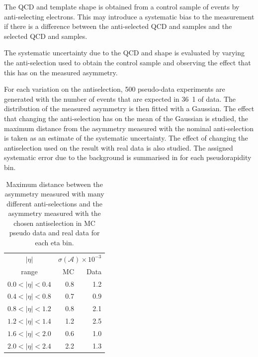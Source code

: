 The \ac{QCD} and \gjet \ETm template shape is obtained from a control sample of
events by anti-selecting electrons. This may introduce a systematic bias to the
measurement if there is a difference between the anti-selected \ac{QCD} and \gjet
\ETm samples and the selected \ac{QCD} and \gjet samples.

The systematic uncertainty due to the \ac{QCD} and \gjet \ETm shape is evaluated by
 varying the anti-selection used to obtain the control sample and observing the
effect that this has on the measured asymmetry.

For each variation on the antiselection, 500 pseudo-data experiments
are
generated with the number of events that are expected in \unit{36.1}{\invpb} of
data. The distribution of the measured asymmetry is then fitted with a
Gaussian.
The effect that changing the anti-selection has on the mean of the Gaussian is
studied, the maximum distance from the asymmetry measured with the nominal
anti-selection is taken as an estimate of the systematic uncertainty.
The effect of changing the antiselection used on the result with real data is
also studied.
The assigned systematic error due to the background is summarised in
 for each pseudorapidity bin.

\begin{table}[htbp]
\begin{center}
\begin{tabular}{crr}
    \toprule
$|\eta|$  &\multicolumn{2}{c}{ $\sigma(\mathcal{A}) \times 10^{-3}$}\\
   range      & MC & Data\\
\midrule
$0.0<|\eta|<0.4$ & 0.8 & 1.2\\
$0.4<|\eta|<0.8$ & 0.7 & 0.9\\
$0.8<|\eta|<1.2$ & 0.8 & 2.1\\
$1.2<|\eta|<1.4$ & 1.2 & 2.5\\
$1.6<|\eta|<2.0$ & 0.6 & 1.0\\
$2.0<|\eta|<2.4$ & 2.2 & 1.3\\
    \bottomrule
\end{tabular}
\caption{Maximum distance between the asymmetry measured with many different anti-selections
and the asymmetry measured with the chosen antiselection in MC pseudo data and real data for each eta bin.}
\label{tab:systQCD}
\end{center}
\end{table}

